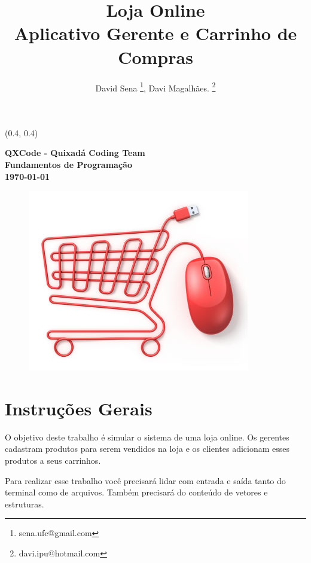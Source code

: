\documentclass[12pt]{article}
\renewcommand{\bf}[1]{\textbf{#1}}
\begin{document}

\begin{textblock}{15}(0.4, 0.4)
\noindent
\begin{center}
\LARGE{\bf{QXCode - Quixadá Coding Team}}\\
\large{\bf{Fundamentos de Programação}} \\
\large{\bf{\today}}
\end{center}
\end{textblock}

\title{\bf{Loja Online\\Aplicativo Gerente e Carrinho de Compras}}

\author{
David Sena \thanks{sena.ufc@gmail.com}, 
Davi Magalhães. \thanks{davi.ipu@hotmail.com}
}

\date{}

\maketitle
\thispagestyle{empty}


\begin{figure}[h!]
\centering
\includegraphics[width=0.4\linewidth]{imagens/loja_virtual}
\label{fig:loja}
\end{figure}

\section{Instruções Gerais}
O objetivo deste trabalho é simular o sistema de uma loja online. Os gerentes cadastram produtos para serem vendidos na loja e os clientes adicionam esses produtos a seus carrinhos.

Para realizar esse trabalho você precisará lidar com entrada e saída tanto do terminal como de arquivos. Também precisará do conteúdo de vetores e estruturas.
\end{document}
